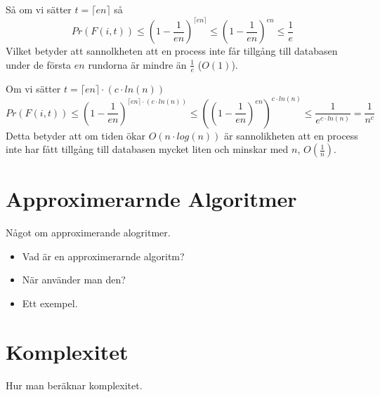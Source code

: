 \documentclass[a4paper]{report}
\begin{document}
Så om vi sätter $t = \lceil{}en\rceil$ så
\begin{equation}
	Pr(F(i,t)) \leq (1 - \frac{1}{en})^{\lceil{}en\rceil} \leq (1 - \frac{1}{en})^{en}
	\leq \frac{1}{e}
\end{equation}
Vilket betyder att sannolkheten att en process inte får tillgång till databasen
under de första $en$ rundorna är mindre än $\frac{1}{e}$ ($O(1)$).

Om vi sätter $t = \lceil{}en\rceil \cdot (c\cdot{}ln(n))$
\begin{equation}
	Pr(F(i,t)) \leq (1 - \frac{1}{en})^{\lceil{}en\rceil \cdot (c\cdot{}ln(n))}
	\leq ((1 - \frac{1}{en})^{en})^{c\cdot{}ln(n)} \leq
	\frac{1}{e^{c\cdot{}ln(n)}} = \frac{1}{n^c}
\end{equation}
Detta betyder att om tiden ökar $O(n\cdot{}log(n))$ är sannolikheten att en
process inte har fått tillgång till databasen mycket liten och minskar med $n$,
$O(\frac{1}{n})$.


\section{Approximerarnde Algoritmer}

Något om approximerande alogritmer.
\begin{itemize}
	\item Vad är en approximerarnde algoritm?
	\item När använder man den?
	\item Ett exempel.
\end{itemize}

\section{Komplexitet}
Hur man beräknar komplexitet.
\end{document}
